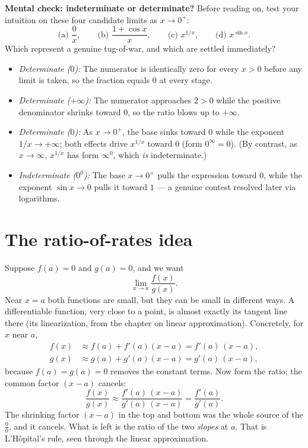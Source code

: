 \begin{recoverybox}
\textbf{Mental check: indeterminate or determinate?}
Before reading on, test your intuition on these four candidate limits as $x\to 0^+$:
\[
\text{(a) }\frac{0}{x},\qquad
\text{(b) }\frac{1+\cos x}{x},\qquad
\text{(c) }x^{1/x},\qquad
\text{(d) }x^{\sin x}.
\]
Which represent a genuine tug-of-war, and which are settled immediately?
\begin{itemize}
  \item[(a)] \emph{Determinate ($0$):} The numerator is identically zero for every $x>0$ before any limit is taken, so the fraction equals $0$ at every stage.
  \item[(b)] \emph{Determinate ($+\infty$):} The numerator approaches $2>0$ while the positive denominator shrinks toward $0$, so the ratio blows up to $+\infty$.
  \item[(c)] \emph{Determinate ($0$):} As $x\to 0^+$, the base sinks toward $0$ while the exponent $1/x\to +\infty$; both effects drive $x^{1/x}$ toward $0$ (form $0^{\infty}=0$). (By contrast, as $x\to\infty$, $x^{1/x}$ has form $\infty^0$, which \emph{is} indeterminate.)
  \item[(d)] \emph{Indeterminate ($0^0$):} The base $x\to 0^+$ pulls the expression toward $0$, while the exponent $\sin x\to 0$ pulls it toward $1$ --- a genuine contest resolved later via logarithms.
\end{itemize}
\end{recoverybox}

\section{The ratio-of-rates idea}

Suppose $f(a)=0$ and $g(a)=0$, and we want
\[
\lim_{x\to a}\frac{f(x)}{g(x)}.
\]
Near $x=a$ both functions are small, but they can be small in different ways. A
differentiable function, very close to a point, is almost exactly its tangent line
there (its linearization, from the chapter on linear approximation). Concretely,
for $x$ near $a$,
\begin{align*}
f(x)&\approx f(a)+f'(a)(x-a)=f'(a)\,(x-a),\\
g(x)&\approx g(a)+g'(a)(x-a)=g'(a)\,(x-a),
\end{align*}
because $f(a)=g(a)=0$ removes the constant terms. Now form the ratio; the
common factor $(x-a)$ cancels:
\[
\frac{f(x)}{g(x)}\approx \frac{f'(a)\,(x-a)}{g'(a)\,(x-a)}=\frac{f'(a)}{g'(a)}.
\]
The shrinking factor $(x-a)$ in the top and bottom was the whole source of the
$\tfrac{0}{0}$, and it cancels. What is left is the ratio of the two
\emph{slopes} at $a$. That is L'H\^opital's rule, seen through the linear
approximation.

